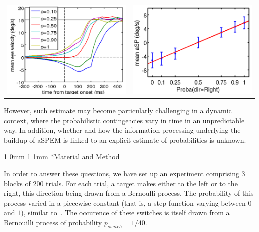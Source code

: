\documentclass[profile,final,english, draft]{sciposter}%
\makeatletter
\renewcommand{\section}{\@startsection
        {section}%
        {1}%
        {0mm}%
        {1\baselineskip}%
        {1mm}%
        {\LARGE\color{red}\bfseries}}%
\makeatother
\begin{document}
\begin{multicols}{3}
\begin{tabular}{cc} 
    \includegraphics[width=.49\columnwidth]{image_anna_1} & 	\includegraphics[width=.49\columnwidth]{image_anna_2}
\end{tabular}

However, such estimate may become particularly challenging in a dynamic context, where the probabilistic contingencies vary in time in an unpredictable way. In addition, whether and how the information processing underlying the buildup of aSPEM is linked to an explicit estimate of probabilities is unknown.


\section*{Material and Method}

In order to answer these questions, we have set up an experiment comprising 3 blocks of 200 trials. For each trial, a target makes either to the left or to the right, this direction being drawn from a Bernoulli process. The probability of this process varied in a piecewise-constant (that is, a step function varying between $0$ and $1$), similar to~\textcite{Meyniel13}. The occurence of these switches is itself drawn from a Bernouilli process of probability $p_{switch}=1/40$.


\end{multicols}
\end{document}
